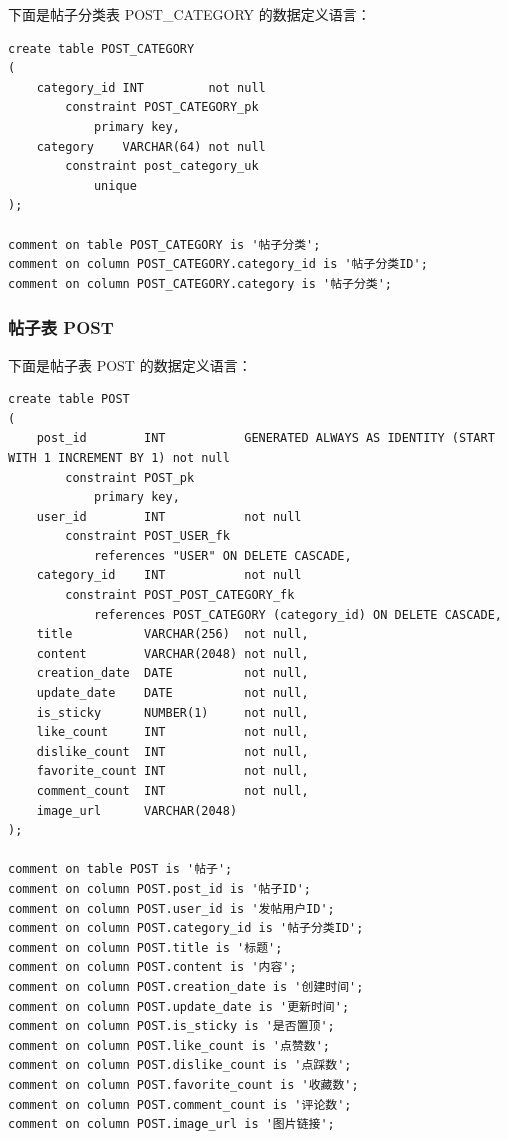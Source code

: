 下面是帖子分类表 POST\_CATEGORY 的数据定义语言：

\begin{verbatim}
create table POST_CATEGORY
(
    category_id INT         not null
        constraint POST_CATEGORY_pk
            primary key,
    category    VARCHAR(64) not null
        constraint post_category_uk
            unique
);

comment on table POST_CATEGORY is '帖子分类';
comment on column POST_CATEGORY.category_id is '帖子分类ID';
comment on column POST_CATEGORY.category is '帖子分类';
\end{verbatim}

\subsubsection{帖子表 POST}

下面是帖子表 POST 的数据定义语言：

\begin{verbatim}
create table POST
(
    post_id        INT           GENERATED ALWAYS AS IDENTITY (START WITH 1 INCREMENT BY 1) not null
        constraint POST_pk
            primary key,
    user_id        INT           not null
        constraint POST_USER_fk
            references "USER" ON DELETE CASCADE,
    category_id    INT           not null
        constraint POST_POST_CATEGORY_fk
            references POST_CATEGORY (category_id) ON DELETE CASCADE,
    title          VARCHAR(256)  not null,
    content        VARCHAR(2048) not null,
    creation_date  DATE          not null,
    update_date    DATE          not null,
    is_sticky      NUMBER(1)     not null,
    like_count     INT           not null,
    dislike_count  INT           not null,
    favorite_count INT           not null,
    comment_count  INT           not null,
    image_url      VARCHAR(2048)
);

comment on table POST is '帖子';
comment on column POST.post_id is '帖子ID';
comment on column POST.user_id is '发帖用户ID';
comment on column POST.category_id is '帖子分类ID';
comment on column POST.title is '标题';
comment on column POST.content is '内容';
comment on column POST.creation_date is '创建时间';
comment on column POST.update_date is '更新时间';
comment on column POST.is_sticky is '是否置顶';
comment on column POST.like_count is '点赞数';
comment on column POST.dislike_count is '点踩数';
comment on column POST.favorite_count is '收藏数';
comment on column POST.comment_count is '评论数';
comment on column POST.image_url is '图片链接';
\end{verbatim}

